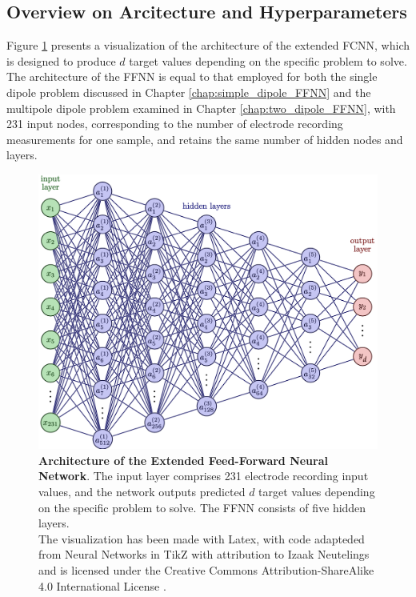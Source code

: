\documentclass[a4paper, UKenglish, 11pt]{uiomaster}
\begin{document}
\subsection{Overview on Arcitecture and Hyperparameters}
Figure \ref{fig:NN_dipole_w_amplitude_architecture} presents a visualization of the architecture of the extended FCNN, which is designed to produce $d$ target values depending on the specific problem to solve. The architecture of the FFNN is equal to that employed for both the single dipole problem discussed in Chapter \ref{chap:simple_dipole_FFNN} and the multipole dipole problem examined in Chapter \ref{chap:two_dipole_FFNN}, with 231 input nodes, corresponding to the number of electrode recording measurements for one sample, and retains the same number of hidden nodes and layers.

\begin{figure}[!htb]
    \centering
    \includegraphics[width=\linewidth]{figures/NN_multiple_outputs.png}
    \caption{\textbf{Architecture of the Extended Feed-Forward Neural Network}. The input layer comprises 231 electrode recording input values, and the network outputs predicted $d$ target values depending on the specific problem to solve. The FFNN consists of five hidden layers. \\
    The visualization has been made with Latex, with code adapteded from Neural Networks in TikZ with attribution to Izaak Neutelings and is licensed under the Creative Commons Attribution-ShareAlike 4.0 International License \cite{neutelings2021}.}
    \label{fig:NN_dipole_w_amplitude_architecture}
\end{figure}
\end{document}
